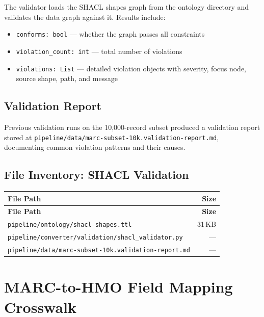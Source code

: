 \documentclass[12pt]{article}
\newcommand{\filepath}[1]{\texttt{\small #1}}
\newcommand{\code}[1]{\texttt{#1}}
\begin{document}
The validator loads the SHACL shapes graph from the ontology directory and validates the data graph against it. Results include:

\begin{itemize}
\item \code{conforms: bool} --- whether the graph passes all constraints
\item \code{violation\_count: int} --- total number of violations
\item \code{violations: List} --- detailed violation objects with severity, focus node, source shape, path, and message
\end{itemize}

\subsection{Validation Report}

Previous validation runs on the 10,000-record subset produced a validation report stored at \filepath{pipeline/data/marc-subset-10k.validation-report.md}, documenting common violation patterns and their causes.

\subsection{File Inventory: SHACL Validation}

\begin{longtable}{|p{10cm}|r|}
\hline
\textbf{File Path} & \textbf{Size} \\
\hline
\endfirsthead
\hline
\textbf{File Path} & \textbf{Size} \\
\hline
\endhead
\hline
\endfoot
\filepath{pipeline/ontology/shacl-shapes.ttl} & 31\,KB \\
\hline
\filepath{pipeline/converter/validation/shacl\_validator.py} & --- \\
\hline
\filepath{pipeline/data/marc-subset-10k.validation-report.md} & --- \\
\hline
\end{longtable}


\section{MARC-to-HMO Field Mapping Crosswalk}
\label{sec:crosswalk}
\end{document}
